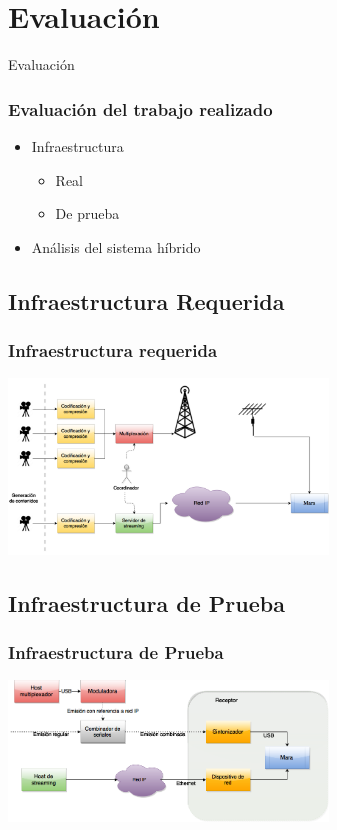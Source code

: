\documentclass[a4paper,11pt]{beamer}
\begin{document}
\section{Evaluación}
		
\begin{frame}

\begin{center}
\Huge Evaluación
\end{center}

\end{frame}


	\begin{frame}
		\frametitle{Evaluación del trabajo realizado}
		\begin{itemize}
			\item Infraestructura
				\begin{itemize}
					\item Real
					\item De prueba
				\end{itemize}
			\item Análisis del sistema híbrido
		\end{itemize}
	\end{frame}

	\subsection{Infraestructura Requerida}
		\begin{frame}
			\frametitle{Infraestructura requerida}
			\begin{center}
				\includegraphics[width=8.5cm]{infraestructura_extendida.png}
			\end{center}
		\end{frame}

	\subsection{Infraestructura de Prueba}
		\begin{frame}
			\frametitle{Infraestructura de Prueba}
			\begin{center}
				\includegraphics[width=8.5cm]{infraestructura_prueba.png}
			\end{center}
		\end{frame}
\end{document}
